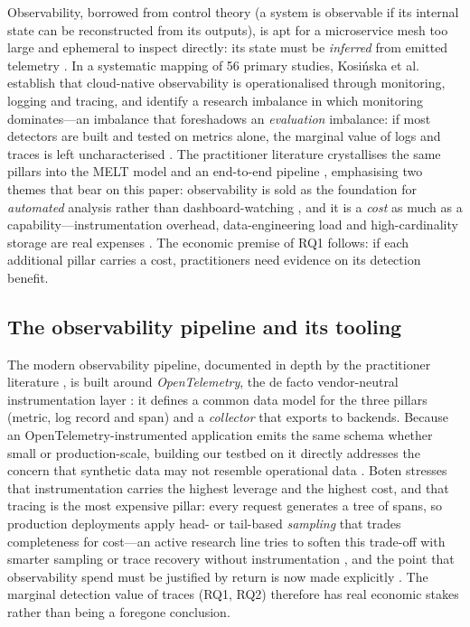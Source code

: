 \documentclass[pdflatex,sn-mathphys-num]{sn-jnl}%
\theoremstyle{thmstyleone}%
\theoremstyle{thmstyletwo}%
\theoremstyle{thmstylethree}%
\begin{document}
Observability, borrowed from control theory (a system is observable if its internal state can be reconstructed from its outputs), is apt for a microservice mesh too large and ephemeral to inspect directly: its state must be \emph{inferred} from emitted telemetry \cite{kosinska2023}. In a systematic mapping of 56 primary studies, Kosi\'nska et al.\ \cite{kosinska2023} establish that cloud-native observability is operationalised through monitoring, logging and tracing, and identify a research imbalance in which monitoring dominates---an imbalance that foreshadows an \emph{evaluation} imbalance: if most detectors are built and tested on metrics alone, the marginal value of logs and traces is left uncharacterised \cite{faseeha2025observability}. The practitioner literature crystallises the same pillars into the MELT model and an end-to-end pipeline \cite{boten2022,chapman2023}, emphasising two themes that bear on this paper: observability is sold as the foundation for \emph{automated} analysis rather than dashboard-watching \cite{beginnersobs,aws2022obs}, and it is a \emph{cost} as much as a capability---instrumentation overhead, data-engineering load and high-cardinality storage are real expenses \cite{leadingobs,kosinska2023}. The economic premise of RQ1 follows: if each additional pillar carries a cost, practitioners need evidence on its detection benefit.

\subsection{The observability pipeline and its tooling}\label{sec:bg-tooling}

The modern observability pipeline, documented in depth by the practitioner literature \cite{boten2022,chapman2023,aws2022obs,beginnersobs}, is built around \emph{OpenTelemetry}, the de facto vendor-neutral instrumentation layer \cite{boten2022,opentelemetry2024spec}: it defines a common data model for the three pillars (metric, log record and span) and a \emph{collector} that exports to backends. Because an OpenTelemetry-instrumented application emits the same schema whether small or production-scale, building our testbed on it directly addresses the concern that synthetic data may not resemble operational data \cite{hrusto2026}. Boten \cite{boten2022} stresses that instrumentation carries the highest leverage and the highest cost, and that tracing is the most expensive pillar: every request generates a tree of spans, so production deployments apply head- or tail-based \emph{sampling} that trades completeness for cost---an active research line tries to soften this trade-off with smarter sampling \cite{huang2025mint,wu2025tracesampling} or trace recovery without instrumentation \cite{ashok2024traceweaver}, and the point that observability spend must be justified by return is now made explicitly \cite{hausenblas2023roi}. The marginal detection value of traces (RQ1, RQ2) therefore has real economic stakes rather than being a foregone conclusion.
\end{document}
